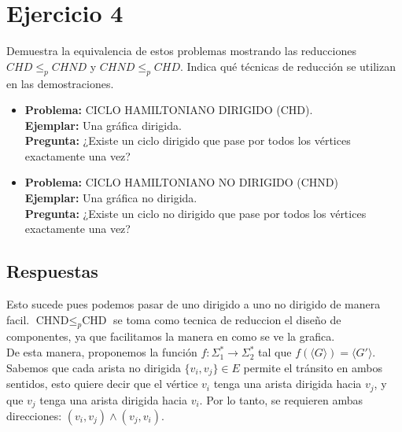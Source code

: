 \section{Ejercicio 4}


\begin{tcolorbox}[enunciado]
Demuestra la equivalencia de estos problemas mostrando las reducciones $CHD \leq_p CHND$ y $CHND\leq_p CHD.$ Indica qué técnicas de reducción se utilizan en las demostraciones.
\begin{itemize}
    \item \textbf{Problema:}  CICLO HAMILTONIANO DIRIGIDO (CHD).\\ 
    \textbf{Ejemplar:} Una gráfica dirigida. \\
    \textbf{Pregunta:} ¿Existe un ciclo dirigido que pase por todos los vértices exactamente una vez? 
    
    \item \textbf{Problema:}  CICLO HAMILTONIANO NO DIRIGIDO (CHND)\\
    \textbf{Ejemplar:}  Una gráfica no dirigida.\\
    \textbf{Pregunta:} ¿Existe un ciclo no dirigido que pase por todos los vértices exactamente una vez?
\end{itemize}
\end{tcolorbox}

\subsection{Respuestas}


Esto sucede pues podemos pasar de uno dirigido a uno no dirigido de manera facil. \textbf{$\text{CHND} \le_p \text{CHD}$} se toma como tecnica de reduccion el diseño de componentes, ya que facilitamos la manera en como se ve la grafica.\\

De esta manera, proponemos la función $f: \Sigma_1^* \rightarrow \Sigma_2^*$ tal que $f(\langle G \rangle) = \langle G' \rangle$. Sabemos que cada arista no dirigida $\{v_i, v_j\} \in E$ permite el tránsito en ambos sentidos, esto quiere decir que el vértice $v_i$ tenga una arista dirigida hacia $v_j$, y que $v_j$ tenga una arista dirigida hacia $v_i$. Por lo tanto, se requieren ambas direcciones: $(v_i, v_j) \land (v_j, v_i)$.\\

